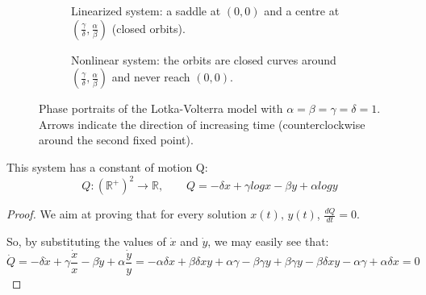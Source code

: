 \begin{figure}[ht]
    \centering
    \begin{subfigure}[t]{0.48\textwidth}
        \centering
        \caption{Linearized system: a saddle at $(0,0)$ and a centre at $(\frac{\gamma}{\delta},\frac{\alpha}{\beta})$ (closed orbits).}
    \end{subfigure}\hfill
    \begin{subfigure}[t]{0.48\textwidth}
        \centering
        \caption{Nonlinear system: the orbits are closed curves around $(\frac{\gamma}{\delta},\frac{\alpha}{\beta})$ and never reach $(0,0)$.}
    \end{subfigure}

    \caption{Phase portraits of the Lotka-Volterra model with $\alpha=\beta=\gamma=\delta=1$.
    Arrows indicate the direction of increasing time (counterclockwise around the second fixed point).}
    \label{fig:lotka_volterra}
\end{figure}

\begin{proposition}
    This system has a constant of motion Q: \begin{equation*}
    Q: (\mathbb{R}^+)^2\rightarrow\mathbb{R}, \qquad Q=-\delta x+\gamma log x -\beta y+\alpha log y
\end{equation*}
\end{proposition}
\begin{proof}
    We aim at proving that for every solution $x(t),\, y(t)$, $\frac{dQ}{dt}=0$. 
    
    So, by substituting the values of $\dot{x}$ and $\dot{y}$, we may easily see that: \begin{equation*}
    \dot{Q}=-\delta \dot{x}+\gamma \frac{\dot{x}}{x}-\beta \dot{y}+\alpha \frac{\dot{y}}{y}=-\alpha \delta x +\beta\delta xy+\alpha\gamma-\beta\gamma y+\beta\gamma y-\beta\delta xy-\alpha\gamma+\alpha\delta x=0\end{equation*}
\end{proof}


